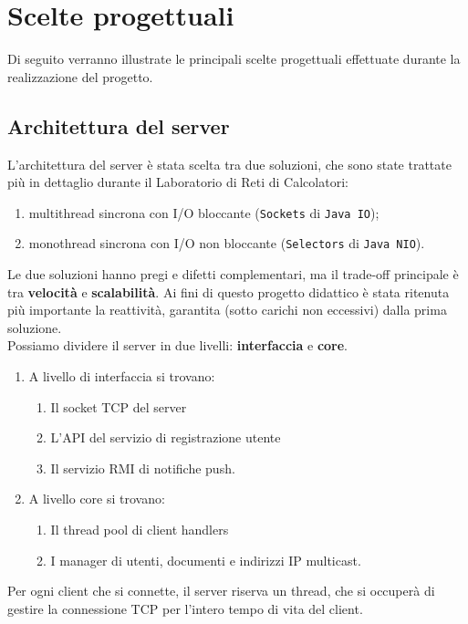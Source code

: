 \section{Scelte progettuali}
Di seguito verranno illustrate le principali scelte progettuali effettuate durante la realizzazione del progetto.

\subsection{Architettura del server}
\sloppy
L'architettura del server è stata scelta tra due soluzioni, che sono state trattate più in dettaglio durante il Laboratorio di Reti di Calcolatori:

\begin{enumerate}
	\item multithread sincrona con I/O bloccante (\texttt{Sockets} di \texttt{Java IO});
	\item monothread sincrona con I/O non bloccante (\texttt{Selectors} di \texttt{Java NIO}).
\end{enumerate}

Le due soluzioni hanno pregi e difetti complementari, ma il trade-off principale è tra \textbf{velocità} e \textbf{scalabilità}. Ai fini di questo progetto didattico è stata ritenuta più importante la reattività, garantita (sotto carichi non eccessivi) dalla prima soluzione.
\medskip \\
Possiamo dividere il server in due livelli: \textbf{interfaccia} e \textbf{core}.

\begin{enumerate}
	\item A livello di interfaccia si trovano:
		\begin{enumerate}
			\item Il socket TCP del server
			\item L'API del servizio di registrazione utente
			\item Il servizio RMI di notifiche push.
		\end{enumerate}
	\item A livello core si trovano:
		\begin{enumerate}
			\item Il thread pool di client handlers
			\item I manager di utenti, documenti e indirizzi IP multicast.
		\end{enumerate}
\end{enumerate}

Per ogni client che si connette, il server riserva un thread, che si occuperà di gestire la connessione TCP per l'intero tempo di vita del client.

